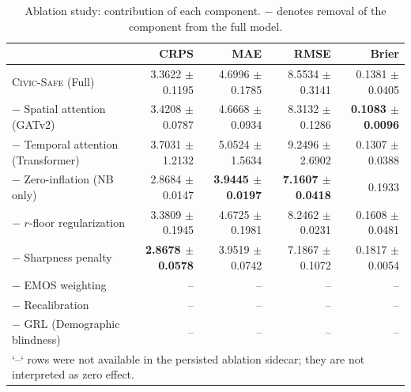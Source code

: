 \begin{table}[htbp]
  \centering
  \caption{Ablation study: contribution of each component. $-$ denotes removal of the component from the full model.}
  \label{tab:ablation}
  \begin{tabular}{l r r r r}
    \toprule
     & \textbf{CRPS} & \textbf{MAE} & \textbf{RMSE} & \textbf{Brier} \\
    \midrule
    \textsc{Civic-Safe} (Full) & 3.3622 $\pm$ 0.1195 & 4.6996 $\pm$ 0.1785 & 8.5534 $\pm$ 0.3141 & 0.1381 $\pm$ 0.0405 \\
    $-$ Spatial attention (GATv2) & 3.4208 $\pm$ 0.0787 & 4.6668 $\pm$ 0.0934 & 8.3132 $\pm$ 0.1286 & \textbf{0.1083 $\pm$ 0.0096} \\
    $-$ Temporal attention (Transformer) & 3.7031 $\pm$ 1.2132 & 5.0524 $\pm$ 1.5634 & 9.2496 $\pm$ 2.6902 & 0.1307 $\pm$ 0.0388 \\
    $-$ Zero-inflation (NB only) & 2.8684 $\pm$ 0.0147 & \textbf{3.9445 $\pm$ 0.0197} & \textbf{7.1607 $\pm$ 0.0418} & 0.1933 \\
    $-$ $r$-floor regularization & 3.3809 $\pm$ 0.1945 & 4.6725 $\pm$ 0.1981 & 8.2462 $\pm$ 0.0231 & 0.1608 $\pm$ 0.0481 \\
    $-$ Sharpness penalty & \textbf{2.8678 $\pm$ 0.0578} & 3.9519 $\pm$ 0.0742 & 7.1867 $\pm$ 0.1072 & 0.1817 $\pm$ 0.0054 \\
    $-$ EMOS weighting & -- & -- & -- & -- \\
    $-$ Recalibration & -- & -- & -- & -- \\
    $-$ GRL (Demographic blindness) & -- & -- & -- & -- \\
    \midrule
    \multicolumn{5}{l}{\footnotesize `--` rows were not available in the persisted ablation sidecar; they are not interpreted as zero effect.} \\
    \bottomrule
  \end{tabular}
\end{table}
